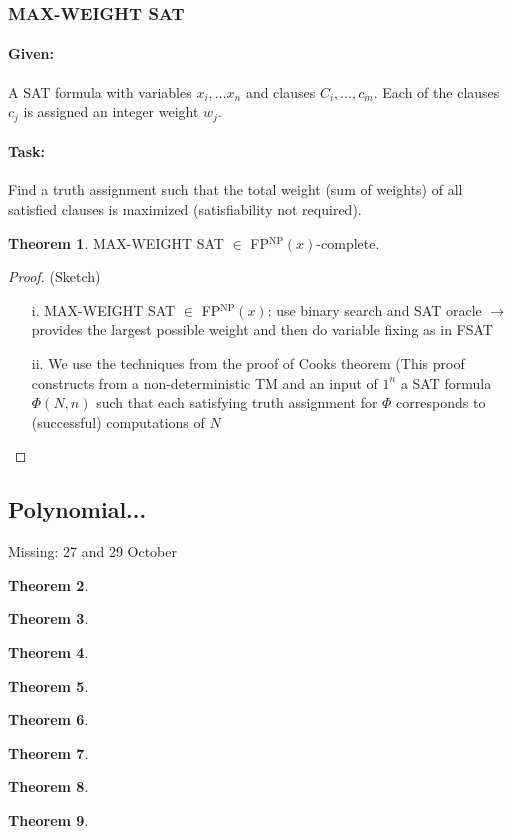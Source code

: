 \documentclass[11pt]{article}
\theoremstyle{definition}
\newtheorem{theorem}{Theorem}[section]
\theoremstyle{definition}
\begin{document}
\subsubsection{MAX-WEIGHT SAT}
\paragraph{Given:} A SAT formula with variables $ x_i, \dots x_n $ and clauses $ C_i, \dots, c_m $. Each of the clauses $ c_j $ is assigned an integer weight $ w_j $.

\paragraph{Task:} Find a truth assignment such that the total weight (sum of weights) of all satisfied clauses is maximized (satisfiability not required).

\begin{theorem}
MAX-WEIGHT SAT  $ \in $ FP$^\text{NP}(x)$-complete.
\end{theorem}

\begin{proof} (Sketch)
\begin{enumerate}
\item[i.] MAX-WEIGHT SAT $ \in $ FP$^\text{NP}(x)$: use binary search and SAT oracle $ \rightarrow $ provides the largest possible weight and then do variable fixing as in FSAT
\item[ii.] We use the techniques from the proof of Cooks theorem (This proof constructs from a non-deterministic TM and an input of $ 1^n $ a SAT formula $ \Phi (N, n)$ such that each satisfying truth assignment for $ \Phi $ corresponds to (successful) computations of $ N $
\end{enumerate}
\end{proof}


\subsection{Polynomial...}
Missing: 27 and 29 October
\begin{theorem}
\end{theorem}
\begin{theorem}
\end{theorem}
\begin{theorem}
\end{theorem}
\begin{theorem}
\end{theorem}
\begin{theorem}
\end{theorem}
\begin{theorem}
\end{theorem}
\begin{theorem}
\end{theorem}
\begin{theorem}
\end{theorem}
\end{document}
